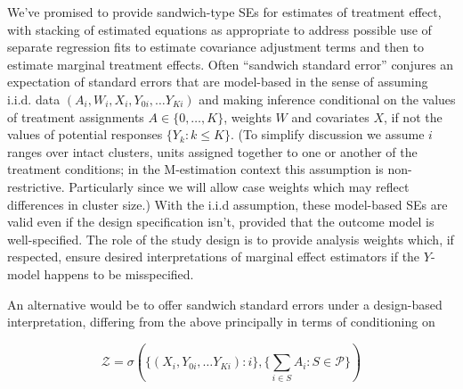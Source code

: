 We've promised to provide sandwich-type SEs for estimates of treatment
effect, with stacking of estimated equations as appropriate to address
possible use of separate regression fits to estimate covariance
adjustment terms and then to estimate marginal treatment effects.
Often ``sandwich standard error'' conjures an expectation of standard
errors that are model-based in the sense of assuming i.i.d.  data
\((A_i,  W_{i}, X_i, Y_{0i}, \ldots Y_{Ki})\) and making inference conditional
on the values of treatment assignments \(A \in
\{0, \ldots, K\}\), weights \(W\) and covariates \(X\), if
not the values of potential responses \(\{Y_k: k \leq K\}\).  (To
simplify discussion we assume $i$ ranges over intact clusters, units
assigned together to one or another of the treatment conditions; in
the M-estimation context this assumption is
non-restrictive. Particularly since we will allow case weights
which may reflect differences in cluster
size.)  With the i.i.d assumption, these model-based SEs are valid
even if the design specification isn't, provided that the outcome
model is well-specified. The role of the study design is to provide
analysis weights which, if respected, ensure desired interpretations
of marginal effect estimators if the \(Y\)-model happens to be
misspecified.

An alternative would be to offer sandwich standard errors under a design-based
interpretation, differing from the above principally in terms of
conditioning on

\[\mathcal{Z} = \sigma(\{(X_i, Y_{0i}, \ldots Y_{Ki}): i\}, \{\sum_{i \in S} A_i : S  \in \mathcal{P}\} )\]

